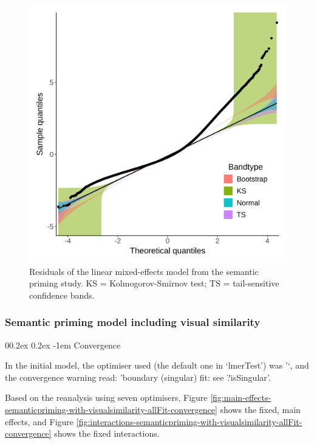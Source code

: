 \documentclass[
  12pt,
  man,floatsintext]{apa7}
\makeatletter
\let\oldparagraph\paragraph
\renewcommand{\paragraph}[1]{\oldparagraph{#1}\mbox{}}
\renewcommand{\paragraph}{\@startsection{paragraph}{4}{\parindent}%
  {0\baselineskip \@plus 0.2ex \@minus 0.2ex}%
  {-1em}%
  {\normalfont\normalsize\bfseries\itshape\typesectitle}}
\makeatother
\begin{document}
\begin{figure}

{\centering \includegraphics[width=0.65\linewidth]{../semanticpriming/frequentist_analysis/model_diagnostics/plots/semanticpriming_residuals} 

}

\caption{Residuals of the linear mixed-effects model from the semantic priming study. \linebreak KS = Kolmogorov-Smirnov test; TS = tail-sensitive confidence bands.}\label{fig:semanticpriming-residuals}
\end{figure}

\hypertarget{semantic-priming-model-including-visual-similarity}{%
\subsubsection{Semantic priming model including visual similarity}\label{semantic-priming-model-including-visual-similarity}}

\hypertarget{convergence-3}{%
\paragraph{Convergence}\label{convergence-3}}

In the initial model, the optimiser used (the default one in `lmerTest') was '`, and the convergence warning read: 'boundary (singular) fit: see ?isSingular'.

Based on the reanalysis using seven optimisers, Figure \ref{fig:main-effects-semanticpriming-with-visualsimilarity-allFit-convergence} shows the fixed, main effects, and Figure \ref{fig:interactions-semanticpriming-with-visualsimilarity-allFit-convergence} shows the fixed interactions.
\end{document}
